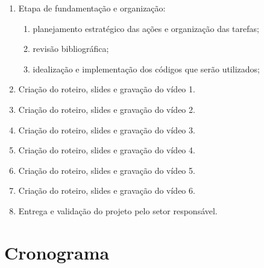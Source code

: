 \documentclass[a4paper,10pt]{article} %
\begin{document}
 \begin{enumerate}
  \item Etapa de fundamentação e organização:
      \begin{enumerate}
         \item planejamento estratégico das ações e organização das tarefas;
         \item revisão bibliográfica;
         \item idealização e implementação dos códigos que serão utilizados;
      \end{enumerate}    
  \item Criação do roteiro, slides e gravação do vídeo 1.
  \item Criação do roteiro, slides e gravação do vídeo 2.
  \item Criação do roteiro, slides e gravação do vídeo 3.
  \item Criação do roteiro, slides e gravação do vídeo 4.
  \item Criação do roteiro, slides e gravação do vídeo 5.
  \item Criação do roteiro, slides e gravação do vídeo 6.
  \item Entrega e validação do projeto pelo setor responsável.
\end{enumerate}

\section{Cronograma}

\end{document}
